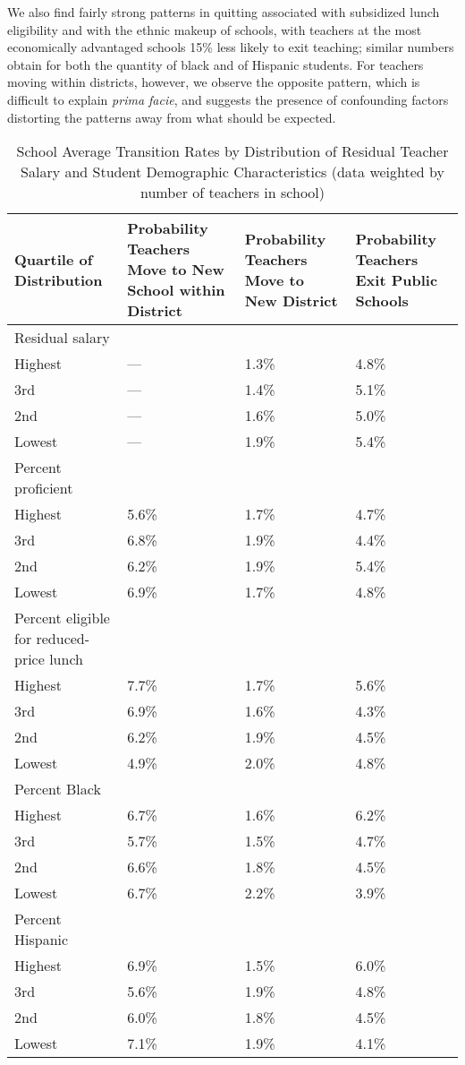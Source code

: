 \documentclass[]{article}
\begin{document}
We also find fairly strong patterns in quitting associated with
subsidized lunch eligibility and with the ethnic makeup of schools, with
teachers at the most economically advantaged schools 15\% less likely to
exit teaching; similar numbers obtain for both the quantity of black and
of Hispanic students. For teachers moving within districts, however, we
observe the opposite pattern, which is difficult to explain \emph{prima
facie}, and suggests the presence of confounding factors distorting the
patterns away from what should be expected.

\begin{table}[htbp]
\centering
\begin{tabular}{p{}p{}p{}p{}}
  \hline
Quartile of Distribution & Probability Teachers Move to New School within District & Probability Teachers Move to New District & Probability Teachers Exit Public Schools \\ 
  \hline
Residual salary & & & \\
\quad Highest & --- & 1.3\% & 4.8\% \\ 
  \quad 3rd & --- & 1.4\% & 5.1\% \\ 
  \quad 2nd & --- & 1.6\% & 5.0\% \\ 
  \quad Lowest & --- & 1.9\% & 5.4\% \\ 
Percent proficient & & & \\
  \quad Highest & 5.6\% & 1.7\% & 4.7\% \\ 
  \quad 3rd & 6.8\% & 1.9\% & 4.4\% \\ 
  \quad 2nd & 6.2\% & 1.9\% & 5.4\% \\ 
  \quad Lowest & 6.9\% & 1.7\% & 4.8\% \\ 
Percent eligible for reduced-price lunch & & & \\
  \quad Highest & 7.7\% & 1.7\% & 5.6\% \\ 
  \quad 3rd & 6.9\% & 1.6\% & 4.3\% \\ 
  \quad 2nd & 6.2\% & 1.9\% & 4.5\% \\ 
  \quad Lowest & 4.9\% & 2.0\% & 4.8\% \\ 
Percent Black & & & \\
  \quad Highest & 6.7\% & 1.6\% & 6.2\% \\ 
  \quad 3rd & 5.7\% & 1.5\% & 4.7\% \\ 
  \quad 2nd & 6.6\% & 1.8\% & 4.5\% \\ 
  \quad Lowest & 6.7\% & 2.2\% & 3.9\% \\ 
Percent Hispanic & & & \\
  \quad Highest & 6.9\% & 1.5\% & 6.0\% \\ 
  \quad 3rd & 5.6\% & 1.9\% & 4.8\% \\ 
  \quad 2nd & 6.0\% & 1.8\% & 4.5\% \\ 
  \quad Lowest & 7.1\% & 1.9\% & 4.1\% \\ 
   \hline
\end{tabular}
\caption{School Average Transition Rates by Distribution of Residual Teacher Salary and Student Demographic Characteristics (data weighted by number of teachers in school)} 
\label{tbl:change_by_quartile}
\end{table}
\end{document}
